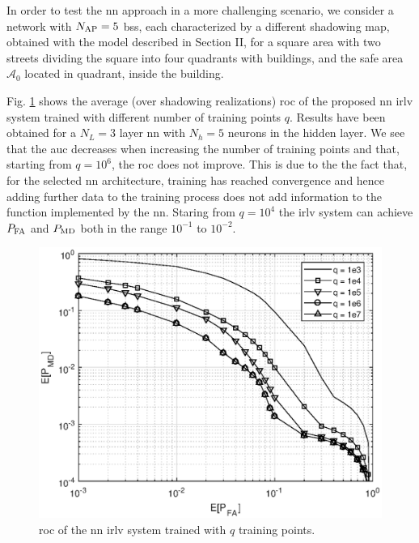 \documentclass[conference]{IEEEtran}
\begin{document}
 
In order to test the \ac{nn} approach in a more challenging scenario, we consider a network with $N_{\rm AP}=5$ \acp{bs}, each  characterized by a different  shadowing map, obtained with the model described in Section II, for a square area with two streets dividing the square into four quadrants with buildings, and the safe area $\mathcal A_0$  located in quadrant, inside the building.




Fig. \ref{fig:n_train} shows the average (over shadowing realizations) \ac{roc} of the proposed \ac{nn} \ac{irlv} system  trained with different number of training points $q$. Results have been obtained for a $N_L=3$ layer \ac{nn} with $N_h=5$ neurons in the hidden layer. We see that the \ac{auc} decreases when increasing the number of training points and that, starting from $q=10^6$, the \ac{roc} does not improve. This is due to the the fact that, for the selected \ac{nn} architecture, training has reached convergence and hence adding further data to the training process does not add information to the function implemented by the \ac{nn}. Staring from $q=10^4$ the \ac{irlv} system can achieve $P_{\rm FA}$ and $P_{\rm MD}$ both in the range $10^{-1}$ to $10^{-2}$.

\begin{figure}[t]
    \centering
    \includegraphics[width=0.9\columnwidth]{mean_maps.eps}
    \caption{\ac{roc} of the \ac{nn} \ac{irlv} system trained with $q$ training points.}
    \label{fig:n_train}
\end{figure}
\end{document}
